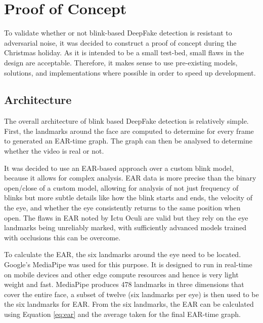 \section{Proof of Concept}
\label{sec:concept-design}


To validate whether or not blink-based DeepFake detection is resistant to adversarial noise, it was decided to construct a proof of concept during the Christmas holiday. As it is intended to be a small test-bed, small flaws in the design are acceptable. Therefore, it makes sense to use pre-existing models, solutions, and implementations where possible in order to speed up development.

\subsection{Architecture}

The overall architecture of blink based DeepFake detection is relatively simple. First, the landmarks around the face are computed to determine for every frame to generated an EAR-time graph. The graph can then be analysed to determine whether the video is real or not.

It was decided to use an EAR-based approach over a custom blink model, because it allows for complex analysis. EAR data is more precise than the binary open/close of a custom model, allowing for analysis of not just frequency of blinks but more subtle details like how the blink starts and ends, the velocity of the eye, and whether the eye consistently returns to the same position when open. The flaws in EAR noted by Ictu Oculi\cite{li2018ictu} are valid but they rely on the eye landmarks being unreliably marked, with sufficiently advanced models trained with occlusions this can be overcome. 

To calculate the EAR, the six landmarks around the eye need to be located. Google's MediaPipe\cite{lugaresi2019mediapipe} was used for this purpose. It is designed to run in real-time on mobile devices and other edge compute resources and hence is very light weight and fast. MediaPipe produces 478 landmarks in three dimensions that cover the entire face, a subset of twelve (six landmarks per eye) is then used to be the six landmarks for EAR. From the six landmarks, the EAR can be calculated using Equation \ref{eq:ear} and the average taken for the final EAR-time graph. 

